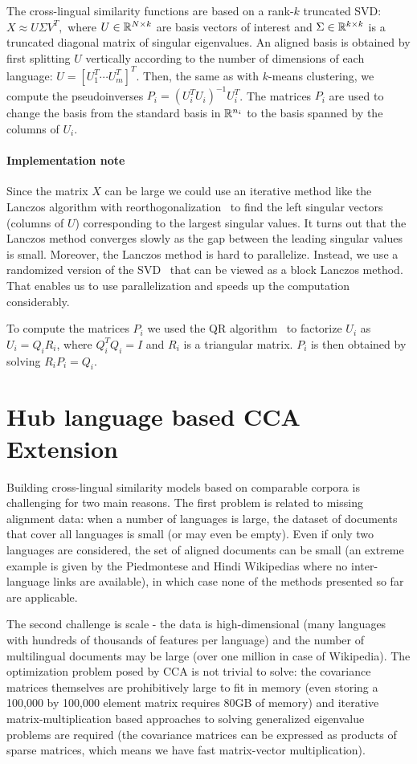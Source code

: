 The cross-lingual similarity functions are based on a rank-$k$ truncated SVD:
$X \approx U \Sigma V^T,$ where $U \in \mathbb{R}^{N \times k}$ are basis vectors of
interest and $\Sigma \in \mathbb{R}^{k \times k}$ is a truncated diagonal matrix of singular
eigenvalues. An aligned basis is obtained by first splitting $U$ vertically according
to the number of dimensions of each language: $U = [U_1^T \cdots U_m^T]^T$. Then, the
same as with $k$-means clustering, we compute the pseudoinverses $P_i = (U_i^T U_i)^{-1} U_i^T$.
The matrices $P_i$ are used to change the basis from the standard basis in $\mathbb{R}^{n_i}$ to the
basis spanned by the columns of $U_i$.

\paragraph{Implementation note}
Since the matrix $X$ can be large we could use an iterative method like the Lanczos
algorithm with reorthogonalization~\cite{golub} to find the left singular vectors
(columns of $U$) corresponding to the largest singular values. It turns out that the
Lanczos method converges slowly as the gap between the leading singular values is small.
Moreover, the Lanczos method is hard to parallelize. Instead, we use a randomized version
of the SVD~\cite{tropp} that can be viewed as a block Lanczos method. That enables us
to use parallelization and speeds up the computation considerably.

To compute the matrices $P_i$ we used the QR algorithm~\cite{golub} to factorize
$U_i$ as $U_i = Q_i R_i$, where $Q_i^TQ_i = I$ and $R_i$ is a triangular matrix.
$P_i$ is then obtained by solving $R_i P_i = Q_i$.


\section{Hub language based CCA Extension}\label{chap:crosslingual:hublang}
Building cross-lingual similarity models based on comparable corpora is challenging for
two main reasons. The first problem is related to missing alignment data: when a number
of languages is large, the dataset of documents that cover all languages is small (or may
even be empty). Even if only two languages are considered, the set of aligned documents
can be small (an extreme example is given by the Piedmontese and Hindi Wikipedias where
no inter-language links are available), in which case none of the methods presented so
far are applicable.

The second challenge is scale - the data is high-dimensional (many languages with
hundreds of thousands of features per language) and the number of multilingual documents may be large (over one million in case of Wikipedia). The optimization problem posed by CCA is not trivial to solve: the covariance matrices themselves are prohibitively
large to fit in memory (even storing a 100,000 by 100,000 element matrix requires 
80GB of memory) and iterative matrix-multiplication based approaches to solving generalized 
eigenvalue problems are required (the covariance matrices can be expressed as products 
of sparse matrices, which means we have fast matrix-vector multiplication).

